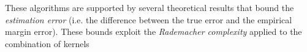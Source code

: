 \documentclass{esannV2}
\newcommand{\1}{{\bf 1}}
\begin{document}
These algorithms are supported by several theoretical results that bound the \emph{estimation error} (i.e. the difference between the true error and the empirical margin error). These bounds exploit the \emph{Rademacher complexity} applied to the combination of kernels \cite{Maurer2012,Cortes2009c}%

%

\end{document}
